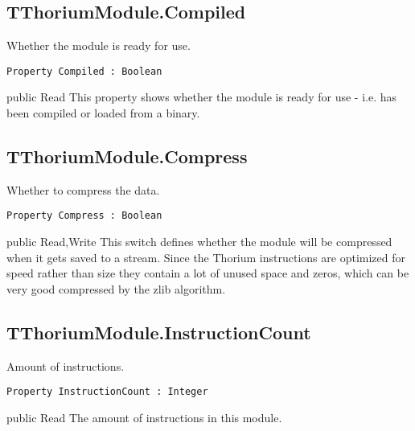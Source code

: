 \subsection{TThoriumModule.Compiled}
\label{thoriumcorepkg:thorium:tthoriummodule:compiled}
\begin{FPCList}
\Synopsis
Whether the module is ready for use.\Declaration 

\begin{verbatim}
Property Compiled : Boolean
\end{verbatim}
\Visibility
public
\Access
Read
\Description
This property shows whether the module is ready for use - i.e. has been compiled or loaded from a binary.\end{FPCList}
\subsection{TThoriumModule.Compress}
\label{thoriumcorepkg:thorium:tthoriummodule:compress}
\begin{FPCList}
\Synopsis
Whether to compress the data.\Declaration 

\begin{verbatim}
Property Compress : Boolean
\end{verbatim}
\Visibility
public
\Access
Read,Write
\Description
This switch defines whether the module will be compressed when it gets saved to a stream. Since the Thorium instructions are optimized for speed rather than size they contain a lot of unused space and zeros, which can be very good compressed by the zlib algorithm.\end{FPCList}
\subsection{TThoriumModule.InstructionCount}
\label{thoriumcorepkg:thorium:tthoriummodule:instructioncount}
\begin{FPCList}
\Synopsis
Amount of instructions.\Declaration 

\begin{verbatim}
Property InstructionCount : Integer
\end{verbatim}
\Visibility
public
\Access
Read
\Description
The amount of instructions in this module.\end{FPCList}

